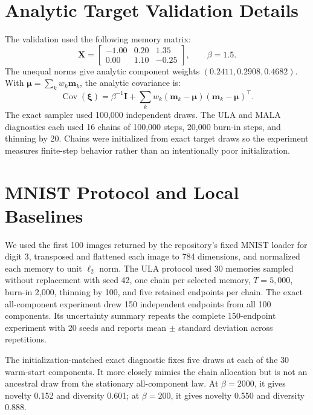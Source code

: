 \section{Analytic Target Validation Details}
\label{app:analytic-validation}

The validation used the following memory matrix:
\begin{equation}
\mathbf X=
\begin{bmatrix}
-1.00 & 0.20 & 1.35\\
 0.00 & 1.10 & -0.25
\end{bmatrix},
\qquad \beta=1.5.
\end{equation}
The unequal norms give analytic component weights
$(0.2411,0.2908,0.4682)$. With
$\boldsymbol\mu=\sum_k w_k\mathbf m_k$, the analytic covariance is:
\begin{equation}
\operatorname{Cov}(\boldsymbol\xi)
=\beta^{-1}\mathbf I+
\sum_k w_k(\mathbf m_k-\boldsymbol\mu)
(\mathbf m_k-\boldsymbol\mu)^\top.
\end{equation}
The exact sampler used 100,000 independent draws. The ULA and MALA diagnostics
each used 16
chains of 100,000 steps, 20,000 burn-in steps, and thinning by 20. Chains were
initialized from exact target draws so the experiment measures finite-step
behavior rather than an intentionally poor initialization.

\section{MNIST Protocol and Local Baselines}
\label{app:mnist-protocol}

We used the first 100 images returned by the repository's fixed MNIST loader for
digit 3, transposed and flattened each image to 784 dimensions, and normalized
each memory to unit $\ell_2$ norm. The ULA protocol used 30 memories
sampled without replacement with seed 42, one chain per selected memory,
$T=5{,}000$, burn-in 2,000, thinning by 100, and five retained endpoints per
chain. The exact all-component experiment drew 150 independent endpoints from
all 100 components. Its uncertainty summary repeats the complete 150-endpoint
experiment with 20 seeds and reports mean $\pm$ standard deviation across
repetitions.

The initialization-matched exact diagnostic fixes five draws at each of the 30
warm-start components. It more closely mimics the chain allocation
but is not an ancestral draw from the stationary all-component law. At
$\beta=2000$, it gives novelty 0.152 and diversity 0.601; at $\beta=200$, it
gives novelty 0.550 and diversity 0.888.

